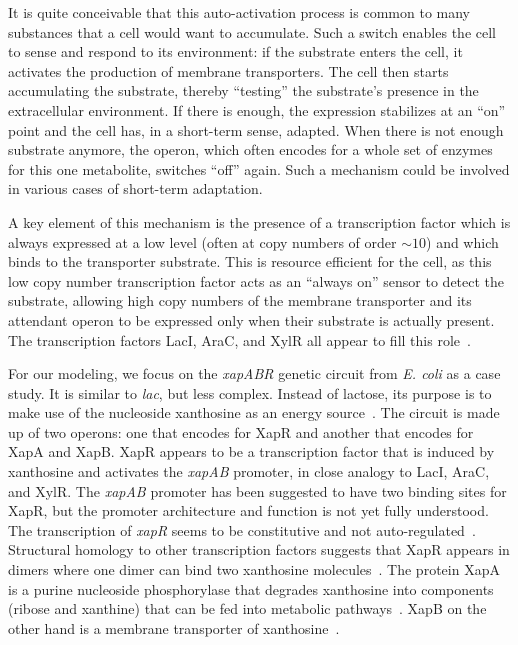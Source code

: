 \documentclass[10pt,letterpaper]{article}
\begin{document}
It is quite conceivable that this auto-activation process is common to many
substances that a cell would want to accumulate. Such a switch enables the
cell to sense and respond to its environment: if the substrate enters the
cell, it activates the production of membrane transporters. The cell then
starts accumulating the substrate, thereby ``testing'' the substrate's
presence in the extracellular environment. If there is enough, the
expression stabilizes at an ``on'' point and the cell has, in a short-term
sense, adapted. When there is not enough substrate anymore, the operon, which
often encodes for a whole set of enzymes for this one metabolite, switches
``off'' again. Such a mechanism could be involved in various cases of
short-term adaptation.

A key element of this mechanism is the presence of a transcription factor
which is always expressed at a low level (often at copy numbers
of order $\sim10$) and which binds to the transporter substrate.
This is resource efficient for the cell, as this low copy number
transcription factor acts as an ``always on'' sensor to detect
the substrate, allowing high copy numbers of the membrane transporter
and its attendant operon to be expressed only when
their substrate is actually present. The transcription factors
LacI, AraC, and XylR all appear to fill this
role~\cite{Novick1957,Narang2008,Choi2008,Ozbudak2004,Fritz2014,Jenkins2017,Siegele1997}.

For our modeling, we focus on the \emph{xapABR} genetic circuit from
\emph{E. coli} as a case study. It is similar to \emph{lac}, but less
complex. Instead of lactose, its purpose is to make use of the nucleoside
xanthosine as an energy source~\cite{Buxton1980,Hammer-Jespersen1980}. The
circuit is made up of two operons: one that encodes for XapR and another
that encodes for XapA and XapB. XapR appears to be a transcription factor
that is induced by xanthosine and activates the \emph{xapAB} promoter,
in close analogy to LacI, AraC, and XylR.
The \textit{xapAB} promoter has been suggested to have two binding sites for XapR\cite{Seeger1995},
but the promoter architecture and function is not yet fully understood. The
transcription of \emph{xapR} seems to be constitutive and not
auto-regulated~\cite{Seeger1995}. Structural homology to other transcription
factors suggests that XapR appears in dimers where one dimer can bind two
xanthosine molecules~\cite{Joergensen1999}. The protein XapA is a purine
nucleoside phosphorylase that degrades xanthosine into components (ribose
and xanthine) that can be fed into metabolic
pathways~\cite{Buxton1980,Hammer-Jespersen1980}. XapB on the other hand is a
membrane transporter of xanthosine~\cite{Seeger1995,Norholm2001}.
\end{document}
